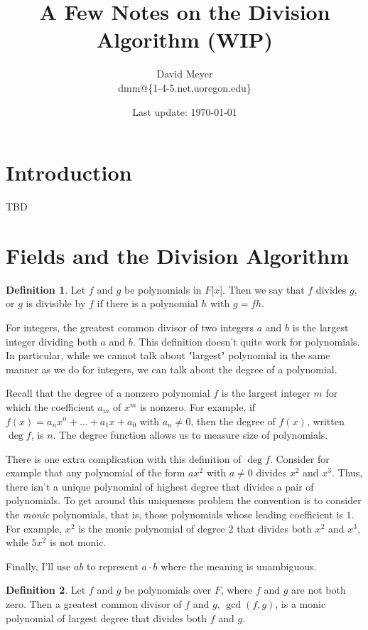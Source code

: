 \documentclass[11pt, oneside]{article}   	%
\title{A Few Notes on the Division Algorithm (WIP)}
\author{David Meyer \\ dmm@\{1-4-5.net,uoregon.edu\}}
\date{Last update: \today}							%
\theoremstyle{definition}
\newtheorem{definition}{Definition}[section]
\begin{document}
\maketitle

\section{Introduction}

TBD


\section{Fields and the Division Algorithm}

\begin{definition}
Let $f$ and $g$ be polynomials in $F[x$]. Then we say that $f$ divides $g$, or $g$ is divisible by $f$ if there is a polynomial $h$ with $g = fh$.
\end{definition}

\noindent
For integers, the greatest common divisor of two integers $a$ and $b$ is the largest integer dividing both
$a$ and $b$. This definition doesn't  quite work for polynomials. In particular, while we cannot talk
about "largest" polynomial in the same manner as we do for integers, we can talk about the degree
of a polynomial. 

\bigskip
\noindent
Recall that the degree of a nonzero polynomial $f$ is the largest integer $m$
for which the coefficient $a_m$ of $x^m$ is nonzero. For example, if $f(x) = a_nx^n + \hdots + a_1x+a_0$ with $a_n \neq 0$, 
then the degree of $f(x)$, written $\deg f$, is $n$. The degree function allows
us to measure size of polynomials. 

\bigskip
\noindent
There is one extra complication with this definition of $\deg f$. Consider for example that any polynomial of the form 
$ax^2$ with $a \neq 0$ divides $x^2$ and $x^3$. Thus, there isn't a unique polynomial of
highest degree that divides a pair of polynomials. To get around this uniqueness problem the convention is to consider 
the \emph{monic} polynomials, that is, those polynomials whose leading coefficient is $1$. For example, $x^2$ is the 
monic polynomial of degree $2$ that divides both $x^2$ and $x^3$, while $5x^2$ is not monic. 

\bigskip
\noindent
Finally, I'll use $ab$ to represent $a \cdot b$ where the meaning is unambiguous. 


\begin{definition}
Let $f$ and $g$ be polynomials over $F$, where $f$ and $g$ are not both zero. Then a greatest common divisor of $f$ and $g$, $\gcd(f,g)$, 
is a monic polynomial of largest degree that divides both $f$ and $g$.
\label{def:gcd}
\end{definition}
\end{document}
